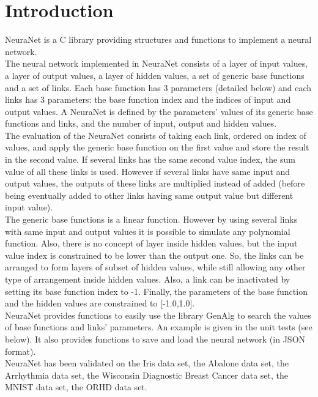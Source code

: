 \section*{Introduction}

NeuraNet is a C library providing structures and functions to implement a neural network.\\ 

The neural network implemented in NeuraNet consists of a layer of input values, a layer of output values, a layer of hidden values, a set of generic base functions and a set of links. Each base function has 3 parameters (detailed below) and each links has 3 parameters: the base function index and the indices of input and output values. A NeuraNet is defined by the parameters' values of its generic base functions and links, and the number of input, output and hidden values.\\

The evaluation of the NeuraNet consists of taking each link, ordered on index of values, and apply the generic base function on the first value and store the result in the second value. If several links has the same second value index, the sum value of all these links is used. However if several links have same input and output values, the outputs of these links are multiplied instead of added (before being eventually added to other links having same output value but different input value).\\

The generic base functions is a linear function. However by using several links with same input and output values it is possible to simulate any polynomial function. Also, there is no concept of layer inside hidden values, but the input value index is constrained to be lower than the output one. So, the links can be arranged to form layers of subset of hidden values, while still allowing any other type of arrangement inside hidden values. Also, a link can be inactivated by setting its base function index to -1. Finally, the parameters of the base function and the hidden values are constrained to [-1.0,1.0].\\

NeuraNet provides functions to easily use the library GenAlg to search the values of base functions and links' parameters. An example is given in the unit tests (see below). It also provides functions to save and load the neural network (in JSON format).\\

NeuraNet has been validated on the Iris data set, the Abalone data set, the Arrhythmia data set, the Wisconsin Diagnostic Breast Cancer data set, the MNIST data set, the ORHD data set.\\

